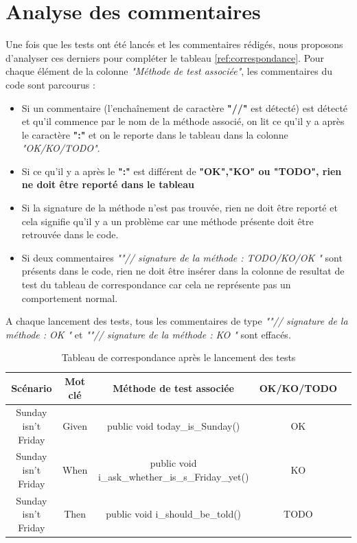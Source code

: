 \section{Analyse des commentaires}

Une fois que les tests ont été lancés et les commentaires rédigés, nous proposons d'analyser ces derniers pour compléter le tableau \ref{ref:correspondance}. Pour chaque élément de la colonne \textit{"Méthode de test associée"}, les commentaires du code sont parcourus :
\begin{itemize}
    \item Si un commentaire (l'enchaînement de caractère \textbf{"\textcolor{dkgreen}{//}"} est détecté) est détecté et qu'il commence par le nom de la méthode associé, on lit ce qu'il y a après le caractère \textbf{"\textcolor{dkgreen}{:}"} et on le reporte dans le tableau dans la colonne \textit{"OK/KO/TODO"}.
    \item Si ce qu'il y a après le \textbf{"\textcolor{dkgreen}{:}"} est différent de \textbf{"OK","KO" ou "TODO", rien ne doit être reporté dans le tableau}
    \item Si la signature de la méthode n'est pas trouvée, rien ne doit être reporté et cela signifie qu'il y a un problème car une méthode présente doit être retrouvée dans le code. 
    \item Si deux commentaires \textit{"\textcolor{dkgreen}{"// signature de la méthode : TODO/KO/OK "}} sont présents dans le code, rien ne doit être insérer dans la colonne de resultat de test du tableau de correspondance car cela ne représente pas un comportement normal. 
\end{itemize}

A chaque lancement des tests, tous les commentaires de type \textit{"\textcolor{dkgreen}{"// signature de la méthode : OK "} } et \textit{"\textcolor{dkgreen}{"// signature de la méthode : KO "} } sont effacés. 

      \begin{table}[H]
        \centering
         \begin{tabular}{|c|c|c|c|c|} 
         \hline
        Scénario & Mot clé & Méthode de test associée & OK/KO/TODO \\ [0.5ex] 
         \hline
          Sunday isn't Friday & Given & public void today\_is\_Sunday() & OK\\
         \hline
         Sunday isn't Friday & When &  public void i\_ask\_whether\_is\_s\_Friday\_yet() & KO\\
         \hline
         Sunday isn't Friday & Then & public void i\_should\_be\_told()& TODO \\
         \hline
        \end{tabular}
        \caption{Tableau de correspondance après le lancement des tests}
        \end{table}
    
